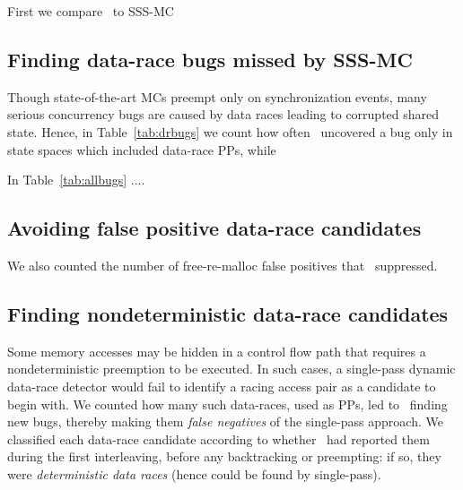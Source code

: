
First we compare \quicksand~to SSS-MC



\subsection{Finding data-race bugs missed by SSS-MC}


Though state-of-the-art MCs preempt only on synchronization events, many serious concurrency bugs are caused by data races leading to corrupted shared state.
Hence, in Table~\ref{tab:drbugs} we count how often \quicksand~uncovered a bug only in state spaces which included data-race PPs,
while

In Table~\ref{tab:allbugs} .... %

\subsection{Avoiding false positive data-race candidates}

We also counted the number of free-re-malloc false positives that \landslide~suppressed.

\subsection{Finding nondeterministic data-race candidates}
\label{sec:eval-falseneg}
Some memory accesses may be hidden in a control flow path that requires a nondeterministic preemption to be executed.
In such cases, a single-pass dynamic data-race detector
would fail
to identify a racing access pair as a candidate to begin with.
%
We counted how many such data-races, used as PPs, led to \quicksand~finding new bugs,
thereby making them {\em false negatives} of the single-pass approach.
We classified each data-race candidate according to whether \landslide~had reported them during the first interleaving, before any backtracking or preempting: if so, they were {\em deterministic data races} (hence could be found by single-pass).

